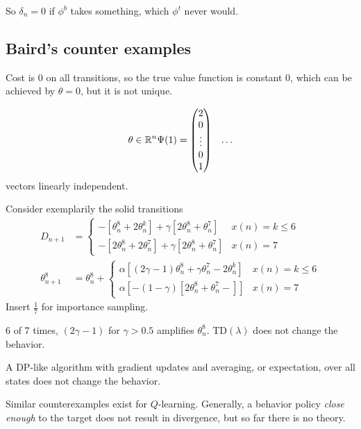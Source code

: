So \(\delta_n=0\) if \(\phi^b\) takes something, which \(\phi^t\) never would.

\subsection{Baird's counter examples} 

Cost is 0 on all transitions, so the true value function is constant \(0\),
which can be achieved by \(\theta=0\), but it is not unique.

\begin{align*}
    \theta\in\mathbb{R}^n & \Psi(1)=\begin{pmatrix}
        2\\0\\\vdots\\0\\1
    \end{pmatrix}&\dots
\end{align*}
vectors linearly independent.

Consider exemplarily the solid transitions 
\begin{align*}
    D_{n+1}&=\begin{cases}
        -\left[\theta_n^8+2\theta_n^k\right]+\gamma\left[2\theta_n^8+\theta_n^7\right] & x(n)=k\leq 6\\
        -\left[2\theta_n^8+2\theta_n^7\right]+\gamma\left[2\theta_n^8+\theta_n^7\right] & x(n)=7
    \end{cases}\\
    \theta_{n+1}^8&=\theta_n^8+\begin{cases}
        \alpha[(2\gamma-1)\theta_n^8+\gamma\theta_n^7-2\theta_n^k] & x(n)=k\leq 6 \\ 
        \alpha[-(1-\gamma)[2\theta_n^8+\theta_n^7-]] & x(n)=7 
    \end{cases}
\end{align*}
Insert \(\frac{1}{7}\) for importance sampling.

6 of 7 times, \((2\gamma-1)\) for \(\gamma>0.5\) amplifies \(\theta_n^8\). TD\((\lambda)\) does 
not change the behavior. 

A DP-like algorithm with gradient updates and averaging, or expectation, over all 
states does not change the behavior. 

Similar counterexamples exist  for \(Q\)-learning. Generally, a behavior policy \textit{close enough}
to the target does not result in divergence, but so far there is no theory. 

